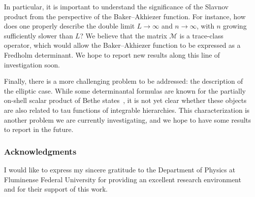 \documentclass[a4paper,11pt]{amsart}
\begin{document}
In particular, it is important to understand the significance of the
Slavnov product from the perspective of the Baker--Akhiezer
function. For instance, how does one properly describe the double
limit \( L \to \infty \) and \( n \to \infty \), with \( n \) growing
sufficiently slower than \( L \)? We believe that the matrix \(
\mathcal{M} \) is a trace-class operator, which would allow the
Baker--Akhiezer function to be expressed as a Fredholm determinant. We
hope to report new results along this line of investigation soon.

Finally, there is a more challenging problem to be addressed: the
description of the elliptic case. While some determinantal formulas
are known for the partially on-shell scalar product of Bethe
states~\cite{Slavnov:2020xxj}, it is not yet clear whether these
objects are also related to tau functions of integrable hierarchies.
This characterization is another problem we are currently
investigating, and we hope to have some results to report in the
future.



\subsubsection*{Acknowledgments}

I would like to express my sincere gratitude to the Department of
Physics at Fluminense Federal University for providing an excellent
research environment and for their support of this work.




\end{document}
